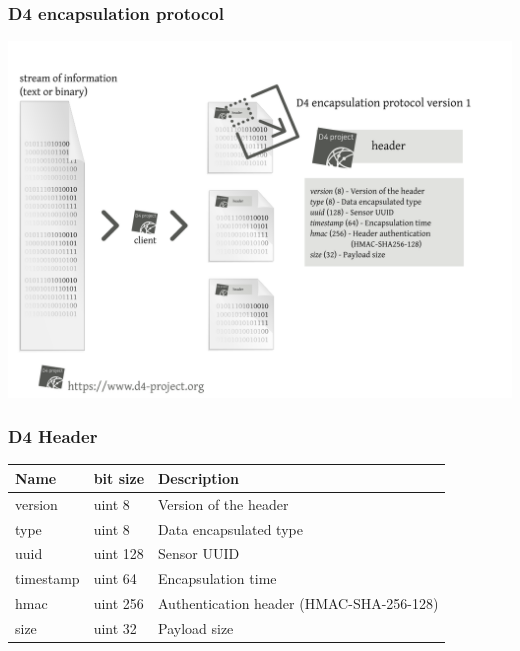 \documentclass{beamer}
\begin{document}
\begin{frame}
        \frametitle{D4 encapsulation protocol}
        \includegraphics[scale=0.38]{d4-protocol-encapsulation.png}
\end{frame}

\begin{frame}
    \frametitle{D4 Header}
    \begin{tabular}{|l|l|l|}
        \hline
        Name & 	bit size&  	Description\\
        \hline
        version &	uint 8 &	Version of the header \\
        type 	& uint 8   &	Data encapsulated type\\
        uuid 	& uint 128 & 	Sensor UUID\\
        timestamp &  	uint 64 &	Encapsulation time\\
        hmac 	& uint 256 &	Authentication header (HMAC-SHA-256-128)\\
        size 	& uint 32 	& Payload size\\
        \hline
    \end{tabular}
\end{frame}
\end{document}
